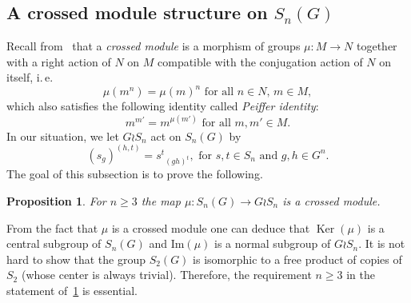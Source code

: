\documentclass[oneside, 12pt]{amsart}
\theoremstyle{plain}
\numberwithin{equation}{section}
\numberwithin{lemma}{section}
\newtheorem{prop}[lemma]{Proposition}
\theoremstyle{remark}
\theoremstyle{definition}
\DeclareMathOperator{\Ker}{Ker}
\begin{document}
\subsection{A crossed module structure on $S_n(G)$}
Recall from~\cite[\S~2.2]{BHS11} that a {\it crossed module} is a morphism of groups $\mu\colon M\to N$ together with a right action of $N$ on $M$ 
compatible with the conjugation action of $N$ on itself, i.\,e.
\begin{equation} \label{eq:precrossed} \tag{CM1} \mu(m^n) = \mu(m)^n \text{ for all $n \in N$, $m \in M$}, \end{equation}
which also satisfies the following identity called {\it Peiffer identity}:
\begin{equation} \label{eq:Peiffer} \tag{CM2} m^{m'} = m^{\mu(m')} \text{ for all $m, m' \in M$}.\end{equation}
In our situation, we let $G \wr S_n$ act on $S_n(G)$ by 
\begin{equation} \label{eq:action} (s_g)^{(h, t)} = {s^t}_{(gh)^t}, \text{ for $s, t \in S_n$ and $g, h \in G^n$.} \end{equation}
The goal of this subsection is to prove the following.
\begin{prop} \label{thm:cms} For $n \geq 3$ the map $\mu \colon S_n(G) \to G \wr S_n $ is a crossed module. \end{prop}
From the fact that $\mu$ is a crossed module one can deduce that $\Ker(\mu)$ is a central subgroup of $S_n(G)$ and $\mathrm{Im}(\mu)$ is a normal subgroup of $G \wr S_n$.
It is not hard to show that the group $S_2(G)$ is isomorphic to a free product of copies of $S_2$ (whose center is always trivial).
Therefore, the requirement $n\geq 3$ in the statement of~\cref{thm:cms} is essential.


\end{document}
